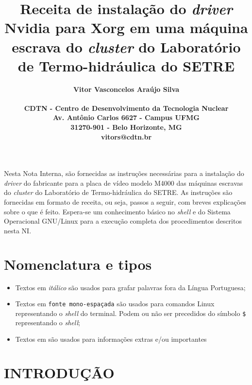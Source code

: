 \documentclass[twoside,a4paper,12pt,english]{inac17}
\title{Receita de instalação do \textit{driver} Nvidia para Xorg em uma máquina escrava do \textit{cluster} do Laboratório de Termo-hidráulica do SETRE}
\author{
  \bf{Vitor Vasconcelos Ara\'ujo Silva}\\ \\
  CDTN - Centro de Desenvolvimento da Tecnologia Nuclear\\
  Av. Ant\^onio Carlos 6627 - Campus UFMG\\
  31270-901 - Belo Horizonte, MG\\
  vitors@cdtn.br}
\begin{document}


\maketitle

\tableofcontents
\tableofcontents


\pagestyle{myheadings}
\thispagestyle{empty}
\markboth{}{}


\thispagestyle{empty}

\begin{abstract_full_paper}
Nesta Nota Interna, são fornecidas as instruções necessárias para a instalação 
do \textit{driver} do fabricante para a placa de vídeo modelo M4000 das máquinas 
escravas do \textit{cluster} do Laboratório de Termo-hidráulica do SETRE. As 
instruções são fornecidas em formato de receita, ou seja, passos a seguir, 
com breves explicações sobre o que é feito. Espera-se um conhecimento básico 
no \textit{shell} e do Sistema Operacional GNU/Linux para a execução completa dos procedimentos descritos nesta NI.
\end{abstract_full_paper}

\section*{Nomenclatura e tipos}
\begin{itemize}
\item Textos em \textit{itálico} são usados para grafar palavras fora da Língua Portuguesa;
\item Textos em \texttt{fonte mono-espaçada} são usados para comandos Linux 
representando o \textit{shell} do terminal. Podem ou não ser precedidos do 
símbolo \texttt{\$} representando o \textit{shell};
\item Textos em  são usados para informações extras e/ou importantes
\end{itemize}
\section{INTRODUÇÃO}\label{int}
\end{document}
